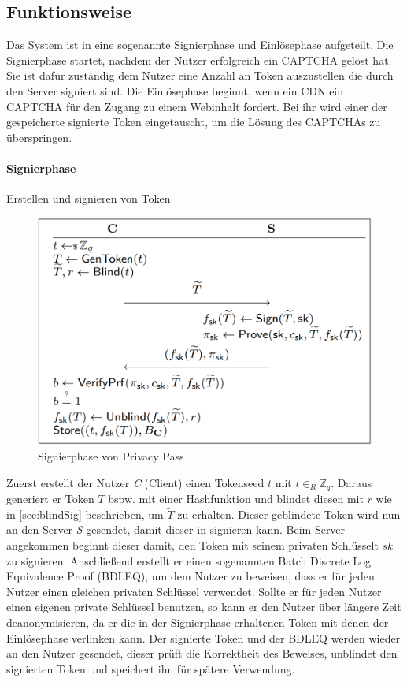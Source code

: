 \documentclass[11pt,a4paper]{scrreprt}
\begin{document}
\subsection{Funktionsweise}
Das System ist in eine sogenannte Signierphase und Einlösephase aufgeteilt. Die Signierphase startet, nachdem der Nutzer erfolgreich ein CAPTCHA gelöst hat. Sie ist dafür zuständig dem Nutzer eine Anzahl an Token auszustellen die durch den Server signiert sind. Die Einlösephase beginnt, wenn ein CDN ein CAPTCHA für den Zugang zu einem Webinhalt fordert. Bei ihr wird einer der gespeicherte signierte Token eingetauscht, um die Lösung des CAPTCHAs zu überspringen. 
\paragraph{Signierphase} Erstellen und signieren von Token

\begin{figure}[H]
    \centering
    \includegraphics[width=0.5\linewidth]{pp_signphase.png}
    \caption{Signierphase von Privacy Pass \cite{pp-davidson2018privacy}}
    \label{fig:pp-signingphase}
\end{figure}
Zuerst erstellt der Nutzer \textit{C} (Client) einen Tokenseed $t$ mit $t {\in}_R \mathbb{Z}_q $. Daraus generiert er Token $T$ bspw. mit einer Hashfunktion und blindet diesen mit $r$ wie in \ref{sec:blindSig} beschrieben, um $\widetilde{T}$ zu erhalten. Dieser geblindete Token wird nun an den Server \textit{S} gesendet, damit dieser in signieren kann. Beim Server angekommen beginnt dieser damit, den Token mit seinem privaten Schlüsselt $sk$ zu signieren. Anschließend erstellt er einen sogenannten Batch Discrete Log Equivalence Proof (BDLEQ), um dem Nutzer zu beweisen, dass er für jeden Nutzer einen gleichen privaten Schlüssel verwendet. Sollte er für jeden Nutzer einen eigenen private Schlüssel benutzen, so kann er den Nutzer über längere Zeit deanonymisieren, da er die in der Signierphase erhaltenen Token mit denen der Einlösephase verlinken kann. Der signierte Token und der BDLEQ werden wieder an den Nutzer gesendet, dieser prüft die Korrektheit des Beweises, unblindet den signierten Token und speichert ihn für spätere Verwendung. 
\end{document}
